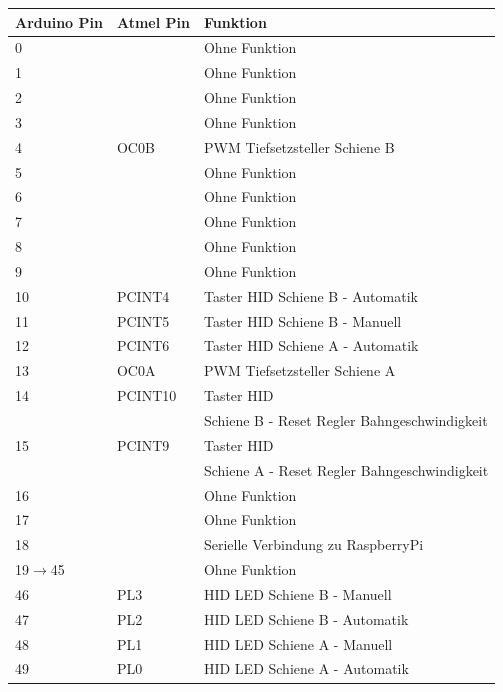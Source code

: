 \documentclass[a4paper, 11pt]{report}
\begin{document}
	\begin{table}[hb]
		\begin{tabular}{|l|l|l|}
			\hline
			\textbf{Arduino Pin} & \textbf{Atmel Pin} &\textbf{Funktion}\\
			\hline
			\hline
			0 &  & Ohne Funktion\\
			\hline
			1 &  & Ohne Funktion\\
			\hline
			2 &  & Ohne Funktion\\
			\hline
			3 &  & Ohne Funktion\\
			\hline
			4 & OC0B & PWM Tiefsetzsteller Schiene B\\
			\hline
			5 &  & Ohne Funktion\\
			\hline
			6 &  & Ohne Funktion\\
			\hline
			7 &  & Ohne Funktion\\
			\hline
			8 &  & Ohne Funktion\\
			\hline
			9 &  & Ohne Funktion\\
			\hline
			10 & PCINT4 & Taster HID \glqq Schiene B - Automatik\grqq \\
			\hline
			11 & PCINT5 & Taster HID \glqq Schiene B - Manuell\grqq \\
			\hline
			12 & PCINT6 & Taster HID \glqq Schiene A - Automatik\grqq \\
			\hline
			13 &  OC0A & PWM Tiefsetzsteller Schiene A\\
			\hline
			14	& PCINT10	& Taster HID \\
				&		& \glqq Schiene B - Reset Regler Bahngeschwindigkeit\grqq \\
			\hline
			15 	& PCINT9 	& Taster HID \\
				&		& \glqq Schiene A - Reset Regler Bahngeschwindigkeit\grqq \\
			\hline
			16 &  & Ohne Funktion\\
			\hline
			17 &  & Ohne Funktion\\
			\hline
			18 &  & Serielle Verbindung zu RaspberryPi\\
			\hline
			19$\rightarrow$45 &  & Ohne Funktion\\
			\hline
			46 & PL3 & HID LED \glqq Schiene B - Manuell\\
			\hline
			47 & PL2 & HID LED \glqq Schiene B - Automatik\\
			\hline
			48 & PL1 & HID LED \glqq Schiene A - Manuell\\
			\hline
			49 & PL0 & HID LED \glqq Schiene A - Automatik\\
			\hline

\end{tabular}
\end{table}
\end{document}
